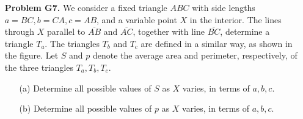 \documentclass[10pt,a4paper]{article}
\begin{document}
\begin{itemize}
		\item[\textbf{Problem G7.}] We consider a fixed triangle $ABC$ with side lengths $a=BC,b=CA,c=AB$, and a variable point $X$ in the interior. The lines through $X$ parallel to $\overline{AB}$ and $\overline{AC}$, together with line $\overline{BC}$, determine a triangle $T_a$. The triangles $T_b$ and $T_c$ are defined in a similar way, as shown in the figure. Let $S$ and $p$ denote the average area and perimeter, respectively, of the three triangles $T_a,T_b,T_c$.
		
		\begin{enumerate}
			\item[(a)] Determine all possible values of $S$ as $X$ varies, in terms of $a,b,c$.
			
			\item[(b)] Determine all possible values of $p$ as $X$ varies, in terms of $a,b,c$.
		\end{enumerate}
	\end{itemize}
\end{document}
